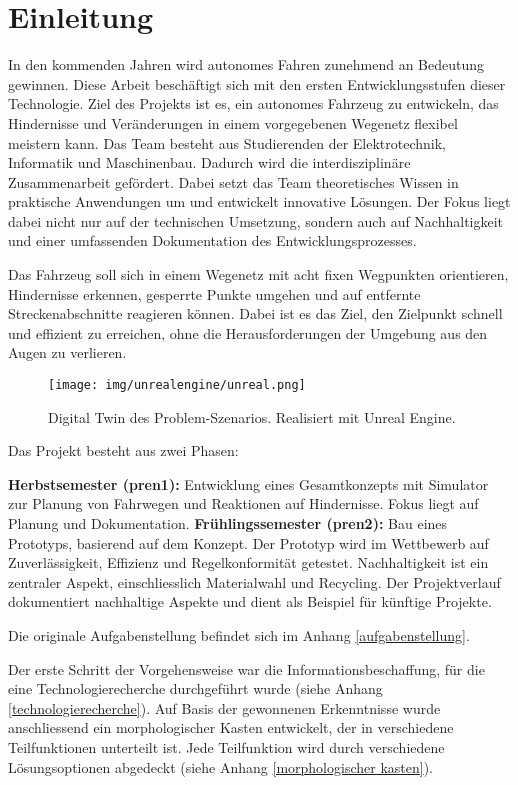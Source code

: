 \documentclass[../main.tex]{subfiles}
\begin{document}
\newpage
\section{Einleitung}

In den kommenden Jahren wird autonomes Fahren zunehmend an Bedeutung gewinnen. Diese Arbeit beschäftigt sich mit den ersten Entwicklungsstufen dieser Technologie. Ziel des Projekts ist es, ein autonomes Fahrzeug zu entwickeln, das Hindernisse und Veränderungen in einem vorgegebenen Wegenetz flexibel meistern kann. Das Team besteht aus Studierenden der Elektrotechnik, Informatik und Maschinenbau. Dadurch wird die interdisziplinäre Zusammenarbeit gefördert. Dabei setzt das Team theoretisches Wissen in praktische Anwendungen um und entwickelt innovative Lösungen. Der Fokus liegt dabei nicht nur auf der technischen Umsetzung, sondern auch auf Nachhaltigkeit und einer umfassenden Dokumentation des Entwicklungsprozesses.

Das Fahrzeug soll sich in einem Wegenetz mit acht fixen Wegpunkten orientieren, Hindernisse erkennen, gesperrte Punkte umgehen und auf entfernte Streckenabschnitte reagieren können. Dabei ist es das Ziel, den Zielpunkt schnell und effizient zu erreichen, ohne die Herausforderungen der Umgebung aus den Augen zu verlieren.
\begin{figure}[H]
    \centering
    \texttt{[image: img/unrealengine/unreal.png]}
    \caption{Digital Twin des Problem-Szenarios. Realisiert mit Unreal Engine\protect\footnotemark.}
    \label{intro_digital_twin}
\end{figure}
Das Projekt besteht aus zwei Phasen:

\textbf{Herbstsemester (\acrshort{pren1}):} Entwicklung eines Gesamtkonzepts mit Simulator zur Planung von Fahrwegen und Reaktionen auf Hindernisse. Fokus liegt auf Planung und Dokumentation.
\textbf{Frühlingssemester (\acrshort{pren2}):} Bau eines Prototyps, basierend auf dem Konzept. Der Prototyp wird im Wettbewerb auf Zuverlässigkeit, Effizienz und Regelkonformität getestet.
Nachhaltigkeit ist ein zentraler Aspekt, einschliesslich Materialwahl und Recycling. Der Projektverlauf dokumentiert nachhaltige Aspekte und dient als Beispiel für künftige Projekte.

Die originale Aufgabenstellung befindet sich im Anhang \ref{aufgabenstellung}.
\newpage

Der erste Schritt der Vorgehensweise war die Informationsbeschaffung, für die eine Technologierecherche durchgeführt wurde (siehe Anhang \ref{technologierecherche}). Auf Basis der gewonnenen Erkenntnisse wurde anschliessend ein morphologischer Kasten entwickelt, der in verschiedene Teilfunktionen unterteilt ist. Jede Teilfunktion wird durch verschiedene Lösungsoptionen abgedeckt (siehe Anhang \ref{morphologischer kasten}).
\end{document}

